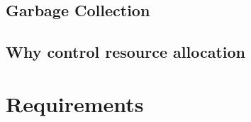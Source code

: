 \documentclass{l4proj}
\begin{document}
\section{Garbage Collection}



\section{Why control resource allocation}
\chapter{Requirements}
\end{document}
